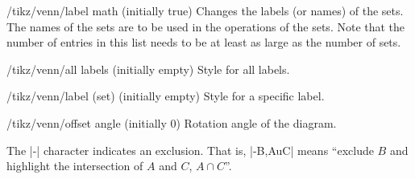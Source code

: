 \documentclass[a4paper]{ltxdoc}
\begin{document}
\begin{codeexample}[width=5cm]
\end{codeexample}


\begin{key}{/tikz/venn/label math (initially true)}
		Changes the labels (or names) of the sets. The names of the sets are to
		be used in the operations of the sets. Note that the number of entries
		in this list needs to be at least as large as the number of sets.
\end{key}

\begin{key}{/tikz/venn/all labels (initially empty)}
		Style for all labels.
\end{key}

\begin{key}{/tikz/venn/label (set) (initially empty)}
		Style for a specific label.
\end{key}

\begin{codeexample}[width=5cm]
\end{codeexample}

\begin{key}{/tikz/venn/offset angle (initially 0)}
		Rotation angle of the diagram.
\end{key}

The |-| character indicates an exclusion. That is, |-B,AuC| means ``exclude $B$
and highlight the intersection of $A$ and $C$, $A\cap C$''.

\begin{codeexample}[width=5cm]
\end{codeexample}
\end{document}
